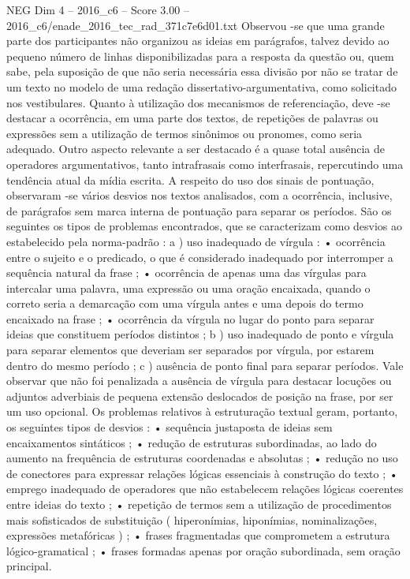 \begin{textsample}{NEG Dim 4 – 2016\_c6 – Score 3.00 – 2016\_c6/enade\_2016\_tec\_rad\_371c7e6d01.txt}
Observou -se que uma grande parte dos participantes não organizou as ideias em parágrafos, talvez devido ao pequeno número de linhas disponibilizadas para a resposta da questão ou, quem sabe, pela suposição de que não seria necessária essa divisão por não se tratar de um texto no modelo de uma redação dissertativo-argumentativa, como solicitado nos vestibulares.
Quanto à utilização dos mecanismos de referenciação, deve -se destacar a ocorrência, em uma parte dos textos, de repetições de palavras ou expressões sem a utilização de termos sinônimos ou pronomes, como seria adequado.
Outro aspecto relevante a ser destacado é a quase total ausência de operadores argumentativos, tanto intrafrasais como interfrasais, repercutindo uma tendência atual da mídia escrita.
A respeito do uso dos sinais de pontuação, observaram -se vários desvios nos textos analisados, com a ocorrência, inclusive, de parágrafos sem marca interna de pontuação para separar os períodos.
São os seguintes os tipos de problemas encontrados, que se caracterizam como desvios ao estabelecido pela norma-padrão : a ) uso inadequado de vírgula : • ocorrência entre o sujeito e o predicado, o que é considerado inadequado por interromper a sequência natural da frase ; • ocorrência de apenas uma das vírgulas para intercalar uma palavra, uma expressão ou uma oração encaixada, quando o correto seria a demarcação com uma vírgula antes e uma depois do termo encaixado na frase ; • ocorrência da vírgula no lugar do ponto para separar ideias que constituem períodos distintos ; b ) uso inadequado de ponto e vírgula para separar elementos que deveriam ser separados por vírgula, por estarem dentro do mesmo período ; c ) ausência de ponto final para separar períodos.
Vale observar que não foi penalizada a ausência de vírgula para destacar locuções ou adjuntos adverbiais de pequena extensão deslocados de posição na frase, por ser um uso opcional.
Os problemas relativos à estruturação textual geram, portanto, os seguintes tipos de desvios : • sequência justaposta de ideias sem encaixamentos sintáticos ; • redução de estruturas subordinadas, ao lado do aumento na frequência de estruturas coordenadas e absolutas ; • redução no uso de conectores para expressar relações lógicas essenciais à construção do texto ; • emprego inadequado de operadores que não estabelecem relações lógicas coerentes entre ideias do texto ; • repetição de termos sem a utilização de procedimentos mais sofisticados de substituição ( hiperonímias, hiponímias, nominalizações, expressões metafóricas ) ; • frases fragmentadas que comprometem a estrutura lógico-gramatical ; • frases formadas apenas por oração subordinada, sem oração principal.

\end{textsample}
